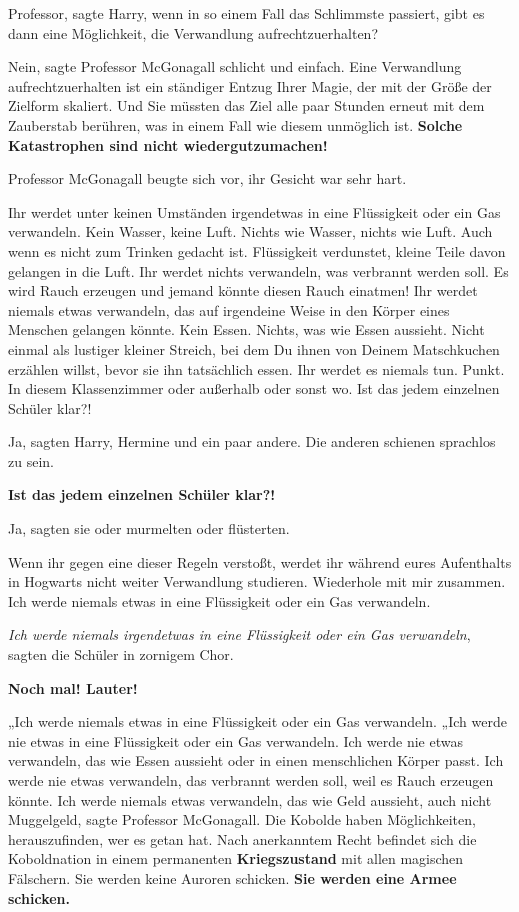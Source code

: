 \glqq Professor\grqq{}, sagte Harry, \glqq wenn in so einem Fall das Schlimmste
passiert, gibt es dann eine Möglichkeit, die Verwandlung
aufrechtzuerhalten?\grqq{}

\glqq Nein\grqq{}, sagte Professor McGonagall schlicht und einfach. \glqq Eine
Verwandlung aufrechtzuerhalten ist ein ständiger Entzug Ihrer Magie, der mit der
Größe der Zielform skaliert. Und Sie müssten das Ziel alle paar Stunden erneut
mit dem Zauberstab berühren, was in einem Fall wie diesem unmöglich ist.
\textbf{ Solche Katastrophen sind nicht wiedergutzumachen!}\grqq{}

Professor McGonagall beugte sich vor, ihr Gesicht war sehr hart.

\glqq Ihr werdet unter keinen Umständen irgendetwas in eine Flüssigkeit oder ein
Gas verwandeln. Kein Wasser, keine Luft. Nichts wie Wasser, nichts wie Luft.
Auch wenn es nicht zum Trinken gedacht ist. Flüssigkeit verdunstet, kleine Teile
davon gelangen in die Luft. Ihr werdet nichts verwandeln, was verbrannt werden
soll. Es wird Rauch erzeugen und jemand könnte diesen Rauch einatmen! Ihr werdet
niemals etwas verwandeln, das auf irgendeine Weise in den Körper eines Menschen
gelangen könnte. Kein Essen. Nichts, was wie Essen aussieht. Nicht einmal als
lustiger kleiner Streich, bei dem Du ihnen von Deinem Matschkuchen erzählen
willst, bevor sie ihn tatsächlich essen. Ihr werdet es niemals tun. Punkt. In
diesem Klassenzimmer oder außerhalb oder sonst wo. Ist das jedem einzelnen
Schüler klar?!\grqq{}

\glqq Ja\grqq{}, sagten Harry, Hermine und ein paar andere. Die anderen
schienen sprachlos zu sein.

\textbf{ \glqq Ist das jedem einzelnen Schüler klar?!\grqq{} }

\glqq Ja\grqq{}, sagten sie oder murmelten oder flüsterten.

\glqq Wenn ihr gegen eine dieser Regeln verstoßt, werdet ihr während eures
Aufenthalts in Hogwarts nicht weiter Verwandlung studieren. Wiederhole mit mir
zusammen. Ich werde niemals etwas in eine Flüssigkeit oder ein Gas
verwandeln.\grqq{}

\glqq \emph{Ich werde niemals irgendetwas in eine Flüssigkeit oder ein Gas
verwandeln}\grqq{}, sagten die Schüler in zornigem Chor.

\glqq \textbf{Noch mal! Lauter! }\grqq{}

„Ich werde niemals etwas in eine Flüssigkeit oder ein Gas verwandeln.\grqq{}
„Ich werde nie etwas in eine Flüssigkeit oder ein Gas verwandeln.\grqq{} \glqq
Ich werde nie etwas verwandeln, das wie Essen aussieht oder in einen
menschlichen Körper passt.\grqq{} \glqq Ich werde nie etwas verwandeln, das
verbrannt werden soll, weil es Rauch erzeugen könnte.\grqq{} \glqq Ich werde
niemals etwas verwandeln, das wie Geld aussieht, auch nicht Muggelgeld\grqq{},
sagte Professor McGonagall. \glqq Die Kobolde haben Möglichkeiten,
herauszufinden, wer es getan hat. Nach anerkanntem Recht befindet sich die
Koboldnation in einem permanenten \textbf{Kriegszustand} mit allen magischen
Fälschern. Sie werden keine Auroren schicken. \textbf{Sie werden eine Armee
schicken.}\grqq{}

